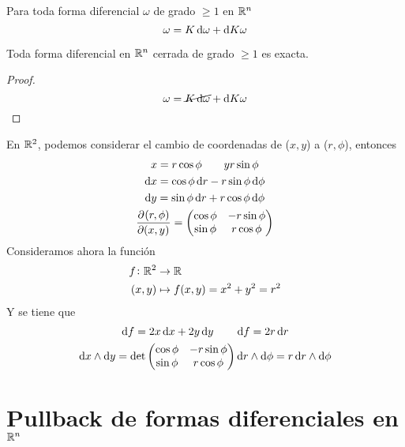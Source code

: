 \begin{lema}
    Para toda forma diferencial $\omega$ de grado $\geq 1$ en $\mathbb{R}^n$
    \[
        \omega = K \dif \omega + \dif K \omega
    \]
\end{lema}

\begin{teo}
    Toda forma diferencial en $\mathbb{R}^n$ cerrada de grado $\geq 1$ es exacta.
\end{teo}
\begin{proof}
    \[
        \omega = \cancel{K\dif \omega} + \dif K \omega
    \]
\end{proof}

\begin{example*}
    En $\mathbb{R}^2$, podemos considerar el cambio de coordenadas de ($x, y$) a ($r, \phi$), entonces
    \begin{gather*}
        x = r \cos \phi \qquad y r \sin \phi \\
        \dif x = \cos \phi \dif r - r \sin \phi \dif \phi \\
        \dif y = \sin \phi \dif r + r \cos \phi \dif \phi \\
        \pdv{(r, \phi)}{(x,y)} =
        \begin{pmatrix}
            \cos \phi & - r \sin \phi \\ \sin \phi & r \cos \phi
        \end{pmatrix}
    \end{gather*}
    Consideramos ahora la función
    \[
        \begin{aligned}
            f \colon \mathbb{R}^2 &\to \mathbb{R} \\
            (x,y) &\mapsto f(x,y) = x^2 + y^2 = r^2
        \end{aligned}
    \]
    Y se tiene que
    \begin{gather*}
        \dif f = 2x \dif x + 2y \dif y \qquad \dif f = 2 r \dif r \\
        \dif x \wedge \dif y = \det
        \begin{pmatrix}
            \cos \phi & - r \sin \phi \\
            \sin \phi &   r \cos \phi
        \end{pmatrix} \dif r \wedge \dif \phi = r \dif r \wedge \dif \phi
    \end{gather*}
\end{example*}

\section{Pullback de formas diferenciales en $\mathbb{R}^n$}

